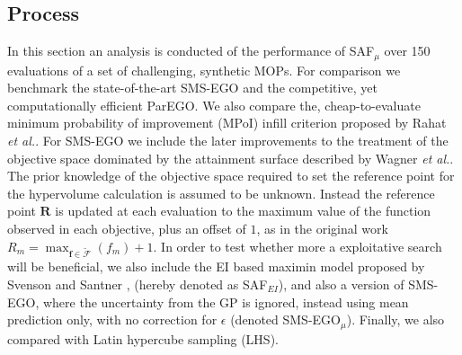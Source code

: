 \documentclass[conference]{IEEEtran}
\makeatletter
\newcommand{\attainmentfront}{\mathcal{A}}
\newcommand{\rp}{\mathbf{R}}
\newcommand\safmu{SAF$_{\mu}$\xspace}
\newcommand\safei{SAF$_{EI}$\xspace}
\newcommand\smsego{SMS-EGO\xspace}
\newcommand\smsegomu{SMS-EGO$_{\mu}$\xspace}
\newcommand\parego{ParEGO\xspace}
\newcommand\mpoi{MPoI\xspace}
\newcommand\ei{EI\xspace}
\newcommand\gp{GP\xspace}
\newcommand\maximin{maximin\xspace}
\newcommand\Fapprox{\tilde{\mathcal{F}}}
\newcommand{\bff}{\mathbf{f}}
\newcommand{\fnote}[2][\textcolor{teal}{\dagger}]{$#1$\marginpar{\color{teal}\raggedright\tiny$#1$
    #2}}
\newcommand*{\etal}{\textit{et al.}\@\xspace}
\makeatother
\begin{document}
\subsection{Process}
In this section an analysis is conducted of the performance of \safmu over 150 evaluations of a set of challenging, synthetic MOPs. For comparison we benchmark the state-of-the-art \smsego \cite{ponweiser2008multiobjective} and the competitive, yet computationally efficient \parego \cite{knowles2006parego}. We also compare the, cheap-to-evaluate minimum probability of improvement (\mpoi) infill criterion proposed by Rahat \etal \cite{rahat2017alternative}. For \smsego we  include the later improvements to the treatment of the objective space dominated by the attainment surface described by Wagner \etal \cite{wagner2010expected}.  The prior knowledge of the objective space required to set the reference point for the hypervolume calculation is assumed to be unknown. Instead the reference point $\rp$ is updated at each evaluation to the maximum value of the function observed in each objective, plus an offset of $1$, as in the original work $R_m = \max_{\bff \in \Fapprox}(f_m) +1$. %
In order to test whether more a exploitative search will be beneficial, we also include the \ei based \maximin model proposed by Svenson and Santner  \cite{svenson2016multiobjective}, (hereby denoted as \safei), and also a version of \smsego, where the uncertainty from the \gp is ignored, instead using mean prediction only, with no correction for $\epsilon$ (denoted \smsegomu). Finally, we also compared with Latin hypercube sampling (LHS). %
\end{document}
